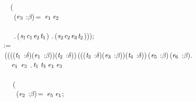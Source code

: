 \,\,\,\,\,\,\,\,\,(\\
\,\,\,\,\,\,\,\,\,\,\,\,(\ensuremath{\HOLBoundVar{e}\sb{\mathrm{3}}} :\ensuremath{\beta})\,=\,\,\,\ensuremath{\HOLBoundVar{e}\sb{\mathrm{1}}}\,\ensuremath{\HOLBoundVar{e}\sb{\mathrm{2}}}\\
\,\,\,\,\,\,\,\,\,\,\\
\,\,\,\,\,\,\,\,\,\,\,\,.\,(\ensuremath{\HOLBoundVar{s}\sb{\mathrm{1}}}\HOLSymConst{,}\ensuremath{\HOLBoundVar{c}\sb{\mathrm{1}}}\HOLSymConst{,}\ensuremath{\HOLBoundVar{e}\sb{\mathrm{2}}}\HOLSymConst{,}\ensuremath{\HOLBoundVar{t}\sb{\mathrm{1}}})\,\HOLSymConst{\HOLTokenConj{}}\,.\,(\ensuremath{\HOLBoundVar{s}\sb{\mathrm{2}}}\HOLSymConst{,}\ensuremath{\HOLBoundVar{c}\sb{\mathrm{2}}}\HOLSymConst{,}\ensuremath{\HOLBoundVar{e}\sb{\mathrm{3}}}\HOLSymConst{,}\ensuremath{\HOLBoundVar{t}\sb{\mathrm{2}}})));\\
\,\,\,:=\\
\,\,\,\,(\HOLTokenLambda{}(((\ensuremath{\HOLBoundVar{t}\sb{\mathrm{1}}} :\ensuremath{\delta})\HOLSymConst{,}(\ensuremath{\HOLBoundVar{e}\sb{\mathrm{1}}} :\ensuremath{\beta}))\HOLSymConst{,}(\ensuremath{\HOLBoundVar{t}\sb{\mathrm{2}}} :\ensuremath{\delta}))\,(((\ensuremath{\HOLBoundVar{t}\sb{\mathrm{3}}} :\ensuremath{\delta})\HOLSymConst{,}(\ensuremath{\HOLBoundVar{e}\sb{\mathrm{3}}} :\ensuremath{\beta}))\HOLSymConst{,}(\ensuremath{\HOLBoundVar{t}\sb{\mathrm{4}}} :\ensuremath{\delta}))\,(\ensuremath{\HOLBoundVar{e}\sb{\mathrm{5}}} :\ensuremath{\beta})\,(\ensuremath{\HOLBoundVar{e}\sb{\mathrm{6}}} :\ensuremath{\beta}).\\
\,\,\,\,\,\,\,\,\,\,\ensuremath{\HOLBoundVar{e}\sb{\mathrm{1}}}\,\HOLSymConst{\HOLTokenNotEqual{}}\,\ensuremath{\HOLBoundVar{e}\sb{\mathrm{3}}}\,\,.\,\ensuremath{\HOLBoundVar{t}\sb{\mathrm{1}}}\,\ensuremath{\HOLBoundVar{t}\sb{\mathrm{3}}}\,\ensuremath{\HOLBoundVar{e}\sb{\mathrm{1}}}\,\ensuremath{\HOLBoundVar{e}\sb{\mathrm{3}}}\\
\,\,\,\,\,\,\,\,\,\\
\,\,\,\,\,\,\,\,\,\,\,(\\
\,\,\,\,\,\,\,\,\,\,\,\,\,\,(\ensuremath{\HOLBoundVar{e}\sb{\mathrm{2}}} :\ensuremath{\beta})\,=\,\,\,\ensuremath{\HOLBoundVar{e}\sb{\mathrm{5}}}\,\ensuremath{\HOLBoundVar{e}\sb{\mathrm{1}}};\\
